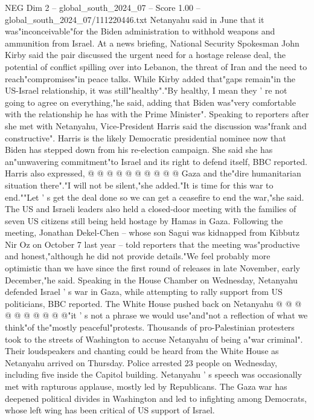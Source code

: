 \begin{textsample}{NEG Dim 2 – global\_south\_2024\_07 – Score 1.00 – global\_south\_2024\_07/111220446.txt}  \label{ex:f2_neg_286}
Netanyahu said in June that it was"inconceivable"for the Biden administration to withhold weapons and ammunition from Israel.
At a news briefing, National Security Spokesman John Kirby said the pair discussed the urgent need for a hostage release deal, the potential of conflict spilling over into Lebanon, the threat of Iran and the need to reach"compromises"in peace talks.
While Kirby added that"gaps remain"in the US-Israel relationship, it was still"healthy"."By healthy, I mean they ' re not going to agree on everything,"he said, adding that Biden was"very comfortable with the relationship he has with the Prime Minister".
Speaking to reporters after she met with Netanyahu, Vice-President Harris said the discussion was"frank and constructive".
Harris is the likely Democratic presidential nominee now that Biden has stepped down from his re-election campaign.
She said she has an"unwavering commitment"to Israel and its right to defend itself, BBC reported.
Harris also expressed, @ @ @ @ @ @ @ @ @ @ Gaza and the"dire humanitarian situation there"."I will not be silent,"she added."It is time for this war to end.""Let ' s get the deal done so we can get a ceasefire to end the war,"she said.
The US and Israeli leaders also held a closed-door meeting with the families of seven US citizens still being held hostage by Hamas in Gaza.
Following the meeting, Jonathan Dekel-Chen -- whose son Sagui was kidnapped from Kibbutz Nir Oz on October 7 last year -- told reporters that the meeting was"productive and honest,"although he did not provide details."We feel probably more optimistic than we have since the first round of releases in late November, early December,"he said.
Speaking in the House Chamber on Wednesday, Netanyahu defended Israel ' s war in Gaza, while attempting to rally support from US politicians, BBC reported.
The White House pushed back on Netanyahu @ @ @ @ @ @ @ @ @ @"it ' s not a phrase we would use"and"not a reflection of what we think"of the"mostly peaceful"protests.
Thousands of pro-Palestinian protesters took to the streets of Washington to accuse Netanyahu of being a"war criminal".
Their loudspeakers and chanting could be heard from the White House as Netanyahu arrived on Thursday.
Police arrested 23 people on Wednesday, including five inside the Capitol building.
Netanyahu ' s speech was occasionally met with rapturous applause, mostly led by Republicans.
The Gaza war has deepened political divides in Washington and led to infighting among Democrats, whose left wing has been critical of US support of Israel.

\end{textsample}
